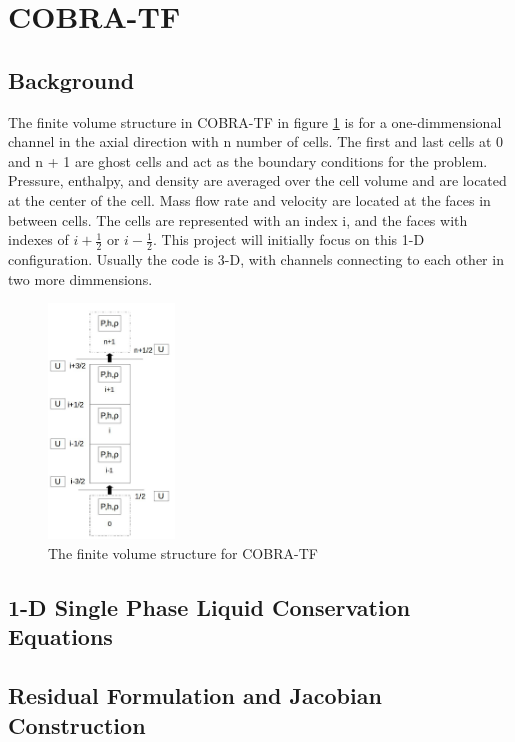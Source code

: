 \documentclass{mc2015}
\begin{document}
\section{COBRA-TF}

\subsection{Background}
The finite volume structure in COBRA-TF in figure \ref{fig:CTF-Cells} is for a
one-dimmensional channel in the axial direction with n number of cells. The
first and last cells at 0 and n + 1 are ghost cells and act as the boundary
conditions for the problem. Pressure, enthalpy, and density are averaged over
the cell volume and are located at the center of the cell. Mass flow rate and
velocity are located at the faces in between cells. The cells  are represented
with an index i, and the faces with indexes of $i + \frac{1}{2}$ or 
$i-\frac{1}{2}$. This project will initially focus on this 1-D configuration.
Usually the code  is 3-D,  with channels connecting to each other in two more 
dimmensions.

\begin{figure}[!h]
	\centering
	\includegraphics[width=0.30\textwidth]{images/CTF-Cells}
	\caption{The finite volume structure for COBRA-TF}
	\label{fig:CTF-Cells}
\end{figure}

\subsection{1-D Single Phase Liquid Conservation Equations}

\subsection{Residual Formulation and Jacobian Construction}
\end{document}
